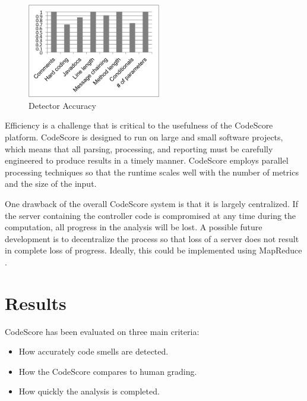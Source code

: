 \documentclass{sig-alternate}
\begin{document}
\begin{figure}[ht!]
	\begin{center}
		\includegraphics[width=220px]{accuracy}
	\end{center}
	\vspace{-12pt}
	\caption{Detector Accuracy}
	\label{fig: acc}
\end{figure}


Efficiency is a challenge that is critical to the usefulness of the CodeScore
platform. CodeScore is designed to run
on large and small software projects, which means that all parsing, processing,
and reporting must be carefully engineered to produce results in a timely
manner. CodeScore employs parallel processing techniques so that the runtime
scales well with the number of metrics and the size of the input.

One drawback of the overall CodeScore system is that it is largely centralized.
If the server containing the controller code is compromised at any time during
the computation, all progress in the analysis will be lost. A possible future development
is to decentralize the process so that loss of a server does
not result in complete loss of progress. Ideally, this could be implemented
using MapReduce \cite{dean2008mapreduce}.

\section{Results}

CodeScore has been evaluated on three main criteria:


\begin{itemize}
	\item How accurately code smells are detected.
	\item How the CodeScore compares to human grading.
	\item How quickly the analysis is completed.
\end{itemize}
\end{document}
